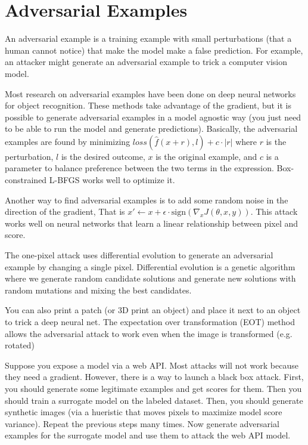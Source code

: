 \documentclass[a4paper]{article}
\begin{document}
\section{Adversarial Examples}
An adversarial example is a training example with small perturbations (that a
human cannot notice) that make the model make a false prediction. For example,
an attacker might generate an adversarial example to trick a computer vision
model.

Most research on adversarial examples have been done on deep neural networks
for object recognition. These methods take advantage of the gradient, but it is
possible to generate adversarial examples in a model agnostic way (you just need
to be able to run the model and generate predictions). Basically, the adversarial
examples are found by minimizing $loss(\hat{f}(x + r), l) + c \cdot |r|$ where
$r$ is the perturbation, $l$ is the desired outcome, $x$ is the original example,
and $c$ is a parameter to balance preference between the two terms in the
expression. Box-constrained L-BFGS works well to optimize it.

Another way to find adversarial examples is to add some random noise in the
direction of the gradient, That is $x' \gets x + \epsilon \cdot
\textrm{sign}(\nabla_x J(\theta, x, y))$. This attack works well on neural
networks that learn a linear relationship between pixel and score.

The one-pixel attack uses differential evolution to generate an adversarial
example by changing a single pixel. Differential evolution is a genetic
algorithm where we generate random candidate solutions and generate new
solutions with random mutations and mixing the best candidates.

You can also print a patch (or 3D print an object) and place it next to an object
to trick a deep neural net. The expectation over transformation (EOT) method
allows the adversarial attack to work even when the image is transformed (e.g.
rotated)

Suppose you expose a model via a web API. Most attacks will not work because
they need a gradient. However, there is a way to launch a black box attack.
First, you should generate some legitimate examples and get scores for them.
Then you should train a surrogate model on the labeled dataset. Then, you should
generate synthetic images (via a hueristic that moves pixels to maximize model
score variance). Repeat the previous steps many times. Now generate adversarial
examples for the surrogate model and use them to attack the web API model.
\end{document}
